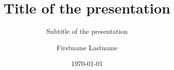 
\title{Title of the presentation}
\subtitle{Subtitle of the presentation}
\author{Firstname Lastname}
\date{\today}

\subject{}
\keywords{}
